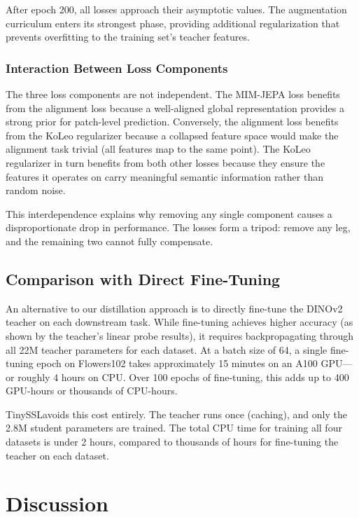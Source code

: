 \documentclass{article}
\newcommand{\method}{TinySSL}
\begin{document}
After epoch 200, all losses approach their asymptotic values. The augmentation curriculum enters its strongest phase, providing additional regularization that prevents overfitting to the training set's teacher features.

\subsubsection*{Interaction Between Loss Components}

The three loss components are not independent. The MIM-JEPA loss benefits from the alignment loss because a well-aligned global representation provides a strong prior for patch-level prediction. Conversely, the alignment loss benefits from the KoLeo regularizer because a collapsed feature space would make the alignment task trivial (all features map to the same point). The KoLeo regularizer in turn benefits from both other losses because they ensure the features it operates on carry meaningful semantic information rather than random noise.

This interdependence explains why removing any single component causes a disproportionate drop in performance. The losses form a tripod: remove any leg, and the remaining two cannot fully compensate.

\subsection{Comparison with Direct Fine-Tuning}

An alternative to our distillation approach is to directly fine-tune the DINOv2 teacher on each downstream task. While fine-tuning achieves higher accuracy (as shown by the teacher's linear probe results), it requires backpropagating through all 22M teacher parameters for each dataset. At a batch size of 64, a single fine-tuning epoch on Flowers102 takes approximately 15 minutes on an A100 GPU---or roughly 4 hours on CPU. Over 100 epochs of fine-tuning, this adds up to 400 GPU-hours or thousands of CPU-hours.

\method avoids this cost entirely. The teacher runs once (caching), and only the 2.8M student parameters are trained. The total CPU time for training all four datasets is under 2 hours, compared to thousands of hours for fine-tuning the teacher on each dataset.

\section{Discussion}
\label{sec:discussion}
\end{document}
